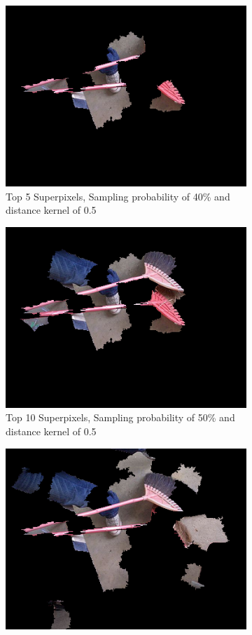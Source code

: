 \begin{figure}
    \captionsetup{justification=centering}

    \begin{subfigure}[t]{0.32\textwidth}
        \captionsetup{justification=centering}
        \centering
        \includegraphics[width=.7\linewidth]{figuras/lime/experiments/broom/lime_broom_sp0.4_dk0.5_nc5.png}
        \caption{Top 5 Superpixels, Sampling probability of 40\% and distance kernel of 0.5}
    \end{subfigure}
    \hfill
    \begin{subfigure}[t]{0.32\textwidth}
        \captionsetup{justification=centering}
        \centering
        \includegraphics[width=.7\linewidth]{figuras/lime/experiments/broom/lime_broom_sp0.5_dk0.5_nc10.png}
        \caption{Top 10 Superpixels, Sampling probability of 50\% and distance kernel of 0.5}
    \end{subfigure}
    \hfill
    \begin{subfigure}[t]{0.32\textwidth}
        \captionsetup{justification=centering}
        \centering
        \includegraphics[width=.7\linewidth]{figuras/lime/experiments/broom/lime_broom_sp0.8_dk1_nc15.png}

\end{subfigure}
\end{figure}
